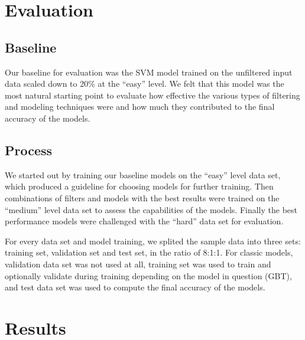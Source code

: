 \documentclass[
	a4paper, %
	10pt, %
	unnumberedsections, %
	twoside, %
]{t0004}
\begin{document}
\section{Evaluation}

\subsection{Baseline}

Our baseline for evaluation was the SVM model trained on the unfiltered input data scaled down to 20\% at the ``easy'' level. We felt that this model was the most natural starting point to evaluate how effective the various types of filtering and modeling techniques were and how much they contributed to the final accuracy of the models.

\subsection{Process}

We started out by training our baseline models on the ``easy'' level data set, which produced a guideline for choosing models for further training. Then combinations of filters and models with the best results were trained on the ``medium'' level data set to assess the capabilities of the models. Finally the best performance models were challenged with the ``hard'' data set for evaluation.

For every data set and model training, we splited the sample data into three sets: training set, validation set and test set, in the ratio of 8:1:1. For classic models, validation data set was not used at all, training set was used to train and optionally validate during training depending on the model in question (GBT), and test data set was used to compute the final accuracy of the models.

\section{Results}
\end{document}
